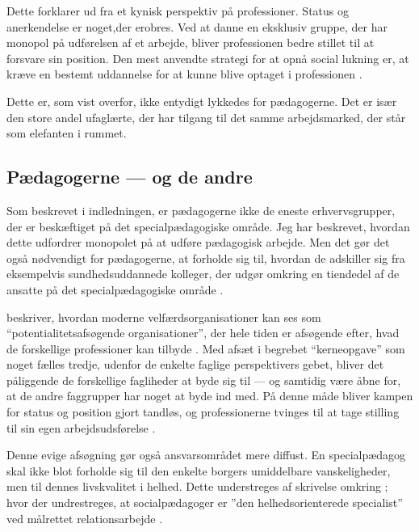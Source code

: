 Dette forklarer \citeauthor{frederiksenVelfaerdsprofessionerMellemOmsorg2017} ud fra et kynisk perspektiv på professioner.
Status og anerkendelse er noget,der erobres.
Ved at danne en eksklusiv gruppe, der har monopol på udførelsen af et arbejde, bliver professionen bedre stillet til at forsvare sin position.
Den mest anvendte strategi for at opnå social lukning er, at kræve en bestemt uddannelse for at kunne blive optaget i professionen \autocite[s. 451ff]{frederiksenVelfaerdsprofessionerMellemOmsorg2017}.

Dette er, som vist overfor, ikke entydigt lykkedes for pædagogerne.
Det er især den store andel ufaglærte, der har tilgang til det samme arbejdsmarked, der står som elefanten i rummet.

\subsection{Pædagogerne — og de andre}

Som beskrevet i indledningen, er pædagogerne ikke de eneste erhvervsgrupper, der er beskæftiget på det specialpædagogiske område.
Jeg har beskrevet, hvordan dette udfordrer monopolet på at udføre pædagogisk arbejde.
Men det gør det også nødvendigt for pædagogerne, at forholde sig til, hvordan de adskiller sig fra eksempelvis sundhedsuddannede kolleger, der udgør omkring en tiendedel af de ansatte på det specialpædagogiske område \autocite[s. 8f]{kommunerneslandsforeningFaktaOmKommunernes2019}.

\citeauthor{porsKerneloseKerneopgaverSkolen2015} beskriver, hvordan moderne velfærdsorganisationer kan ses som “potentialitetsafsøgende organisationer”, der hele tiden er afsøgende efter, hvad de forskellige professioner kan tilbyde \autocite[s 310]{porsKerneloseKerneopgaverSkolen2015}.
Med afsæt i begrebet “kerneopgave” som noget fælles tredje, udenfor de enkelte faglige perspektivers gebet, bliver det påliggende de forskellige fagliheder at byde sig til — og samtidig være åbne for, at de andre faggrupper har noget at byde ind med.
På denne måde bliver kampen for status og position gjort tandløs, og professionerne tvinges til at tage stilling til sin egen arbejdsudsførelse \autocite[s. 311 ff.]{porsKerneloseKerneopgaverSkolen2015}.

Denne evige afsøgning gør også ansvarsområdet mere diffust. En specialpædagog skal ikke blot forholde sig til den enkelte borgers umiddelbare vanskeligheder, men til dennes livskvalitet i helhed.
Dette understreges af \citeauthor{socialpaedagogerneSocialpaedagogiskeKernefaglighed2015} skrivelse omkring ; hvor der undrestreges, at socialpædagoger er ”den helhedsorienterede specialist” ved målrettet relationsarbejde \autocite{socialpaedagogerneSocialpaedagogiskeKernefaglighed2015}.


